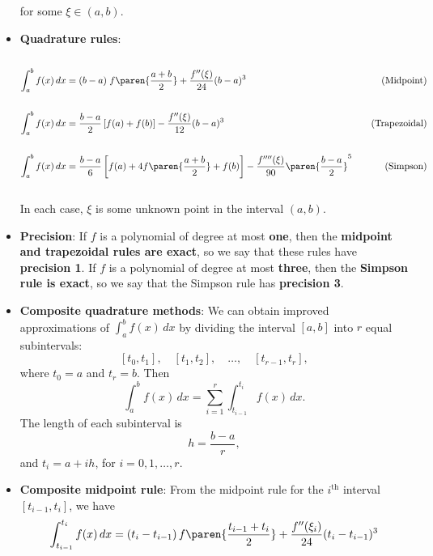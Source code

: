 \documentclass{report}
\begin{document}
\begin{itemize}
$$            $$
            for some $\xi \in (a,b)$.
        \item \textbf{Quadrature rules}:
            \begin{align*}
                \\
                \int_a^b f(x)\,dx &= (b - a)\;f\paren{\frac{a+b}{2}} + \frac{f''(\xi)}{24} (b - a)^3 \quad &\text{(Midpoint)} \\\\
                \int_a^b f(x)\,dx &= \frac{b - a}{2}\left[f(a) + f(b)\right] -\frac{f''(\xi)}{12} (b - a)^3 \quad &\text{(Trapezoidal)} \\\\
                \int_a^b f(x)\,dx &= \frac{b - a}{6}\left[f(a) + 4f\paren{\frac{a+b}{2}} + f(b)\right] -\frac{f''''(\xi)}{90} \paren{\frac{b - a}{2}}^5\quad &\text{(Simpson)} \\\\
            \end{align*}
            In each case, $\xi$ is some unknown point in the interval $(a,b)$.
        \item \textbf{Precision}:
            If $f$ is a polynomial of degree at most \textbf{one}, then the \textbf{midpoint and trapezoidal rules  are exact}, so we say that these rules have \textbf{precision 1}.
            \bigbreak \noindent 
            If $f$ is a polynomial of degree at most \textbf{three}, then the \textbf{Simpson rule is exact}, so we say that the Simpson rule has \textbf{precision 3}.
        \item \textbf{Composite quadrature methods}:
            We can obtain improved approximations of $\int_a^b f(x)\,dx$ by dividing the interval $[a,b]$ into $r$ equal subintervals:
            $$[t_0,t_1], \quad [t_1,t_2], \quad \ldots, \quad [t_{r-1},t_r],$$
            where $t_0 = a$ and $t_r = b$.  Then
            $$
            \int_a^b f(x)\,dx = \sum_{i=1}^r \int_{t_{i-1}}^{t_i} f(x)\,dx.
            $$
            The length of each subinterval is
            $$ h = \frac{b - a}{r},$$
            and $t_i = a + ih$, for $i = 0, 1, \ldots, r$.
        \item \textbf{Composite midpoint rule}:
            From the midpoint rule for the $i^{\mathrm{th}}$ interval $[t_{i-1},t_i]$, we have
            \begin{align*}
                \int_{t_{i-1}}^{t_i} f(x)\,dx 
                & = (t_i - t_{i-1})\,f\paren{\frac{t_{i-1} + t_i}{2}} + \frac{f''(\xi_i)}{24}(t_i - t_{i-1})^3 \\

\end{align*}
\end{itemize}
\end{document}

